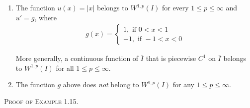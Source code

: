 \documentclass[a4paper,oneside]{book}
\numberwithin{equation}{chapter}
\begin{document}
\begin{enumerate}
\item The function $u\left( x \right) = \left| x \right|$ belongs to ${W^{1,p}}\left( I \right)$ for every $1\le p\le \infty$ and $u'=g$, where
\begin{align}
g\left( x \right) = \left\{ {\begin{array}{*{20}{c}}
{1,\mbox{ if } 0 < x < 1}\\
{ - 1,\mbox{ if } - 1 < x < 0}
\end{array}} \right.
\end{align}

More generally, a continuous function of $\bar{I}$ that is piecewise $C^1$ on $\bar{I}$ belongs to ${W^{1,p}}\left( I \right)$ for all $1\le p\le \infty$.
\item The function $g$ above does \textit{not} belong to ${W^{1,p}}\left( I \right)$ for any $1\le p \le \infty$.
\end{enumerate}
\textsc{Proof of Example 1.15.} 
\end{document}
